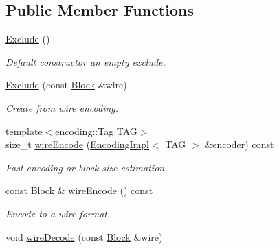 \subsection*{Public Member Functions}
\begin{DoxyCompactItemize}
\item 
\hyperlink{classndn_1_1Exclude_a543e9a04b6b036b0a03c21b942ec92fb}{Exclude} ()\hypertarget{classndn_1_1Exclude_a543e9a04b6b036b0a03c21b942ec92fb}{}\label{classndn_1_1Exclude_a543e9a04b6b036b0a03c21b942ec92fb}

\begin{DoxyCompactList}\small\item\em Default constructor an empty exclude. \end{DoxyCompactList}\item 
\hyperlink{classndn_1_1Exclude_a149fe696f34072c11f2545de630c83aa}{Exclude} (const \hyperlink{classndn_1_1Block}{Block} \&wire)\hypertarget{classndn_1_1Exclude_a149fe696f34072c11f2545de630c83aa}{}\label{classndn_1_1Exclude_a149fe696f34072c11f2545de630c83aa}

\begin{DoxyCompactList}\small\item\em Create from wire encoding. \end{DoxyCompactList}\item 
{\footnotesize template$<$encoding\+::\+Tag T\+AG$>$ }\\size\+\_\+t \hyperlink{classndn_1_1Exclude_a52cbc70f5cc307f859382d05afced386}{wire\+Encode} (\hyperlink{classndn_1_1encoding_1_1EncodingImpl}{Encoding\+Impl}$<$ T\+AG $>$ \&encoder) const\hypertarget{classndn_1_1Exclude_a52cbc70f5cc307f859382d05afced386}{}\label{classndn_1_1Exclude_a52cbc70f5cc307f859382d05afced386}

\begin{DoxyCompactList}\small\item\em Fast encoding or block size estimation. \end{DoxyCompactList}\item 
const \hyperlink{classndn_1_1Block}{Block} \& \hyperlink{classndn_1_1Exclude_a1f5f986e1cb38f4b8b12341fb443dd56}{wire\+Encode} () const\hypertarget{classndn_1_1Exclude_a1f5f986e1cb38f4b8b12341fb443dd56}{}\label{classndn_1_1Exclude_a1f5f986e1cb38f4b8b12341fb443dd56}

\begin{DoxyCompactList}\small\item\em Encode to a wire format. \end{DoxyCompactList}\item 
void \hyperlink{classndn_1_1Exclude_a3a6d4959001595f1ec4678e881fdfedb}{wire\+Decode} (const \hyperlink{classndn_1_1Block}{Block} \&wire)\hypertarget{classndn_1_1Exclude_a3a6d4959001595f1ec4678e881fdfedb}{}\label{classndn_1_1Exclude_a3a6d4959001595f1ec4678e881fdfedb}


\end{DoxyCompactItemize}
